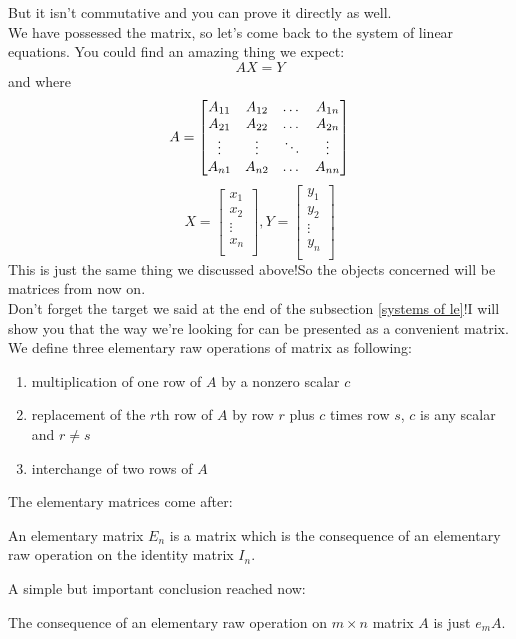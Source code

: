 \documentclass{article}
\begin{document}
But it isn't commutative and you can prove it directly as well.\\
\indent We have possessed the matrix, so let's come back to the system of linear equations. You could find an amazing thing we expect:
\[AX=Y\]and where
\[A=\begin{bmatrix}
	A_{11}&A_{12}&$\ldots$&A_{1n}\\
	A_{21}&A_{22}&$\ldots$&A_{2n}\\
	\vdots&\vdots&\ddots&\vdots\\
	A_{n1}&A_{n2}&$\ldots$&A_{nn}
\end{bmatrix}\]
\[X=\begin{bmatrix}
	x_1\\
	x_2\\
	\vdots\\
	x_n\\
\end{bmatrix},
Y=\begin{bmatrix}
y_1\\
y_2\\
\vdots\\
y_n\\
\end{bmatrix}\]This is just the same thing we discussed above!So the objects concerned will be matrices from now on.\\
\indent Don't forget the target we said at the end of the subsection \ref{systems of le}!I will show you that the way we're looking for can be presented as a convenient matrix.\\
\indent We define three elementary raw operations of matrix as following:
\begin{enumerate}
	\item multiplication of one row of $A$ by a nonzero scalar $c$
	\item replacement of the $r$th row of $A$ by row $r$ plus $c$ times row $s$, $c$ is any scalar and $r\neq s$
	\item interchange of two rows of $A$
\end{enumerate}
The elementary matrices come after:
\begin{dde}
	An elementary matrix $E_n$ is a matrix which is the consequence of an elementary raw operation on the identity matrix $I_n$. 
\end{dde}
A simple but important conclusion reached now:
\begin{pro}
	The consequence of an elementary raw operation on $m\times n$ matrix $A$ is just $e_mA$.
\end{pro}
\end{document}
